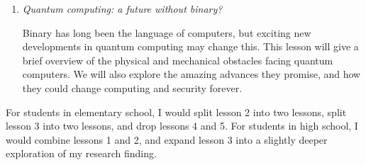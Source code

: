 \begin{enumerate}
  \item \emph{Quantum computing: a future without binary?}

  Binary has long been the language of computers, but exciting new developments in quantum computing may change this.
  This lesson will give a brief overview of the physical and mechanical obstacles facing quantum computers.
  We will also explore the amazing advances they promise, and how they could change computing and security forever.

\end{enumerate}

For students in elementary school, I would split lesson 2 into two lessons, split lesson 3 into two lessons, and drop lessons 4 and 5.
For students in high school, I would combine lessons 1 and 2, and expand lesson 3 into a slightly deeper exploration of my research finding.
